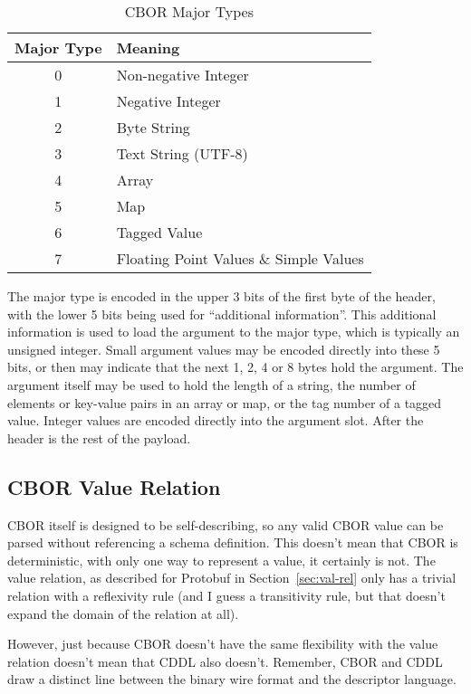 \documentclass[11pt]{article}
\theoremstyle{definition}
\theoremstyle{plain}
\begin{document}
\begin{table}[htbp]
  \centering
  \begin{tabular}{cl}
    \toprule
    Major Type & Meaning \\
    \midrule
    0 & Non-negative Integer \\
    1 & Negative Integer \\
    2 & Byte String \\
    3 & Text String (UTF-8) \\
    4 & Array \\
    5 & Map \\
    6 & Tagged Value \\
    7 & Floating Point Values \& Simple Values \\
    \bottomrule
  \end{tabular}
\caption{CBOR Major Types}
\label{tab:cbor-major-type}
\end{table}

The major type is encoded in the upper 3 bits of the first byte of the header,
with the lower 5 bits being used for ``additional information''. This additional
information is used to load the argument to the major type, which is typically
an unsigned integer. Small argument values may be encoded directly into these 5
bits, or then may indicate that the next 1, 2, 4 or 8 bytes hold the
argument. The argument itself may be used to hold the length of a string, the
number of elements or key-value pairs in an array or map, or the tag number of a
tagged value. Integer values are encoded directly into the argument slot. After
the header is the rest of the payload. 

\subsection{CBOR Value Relation}

CBOR itself is designed to be self-describing, so any valid CBOR value can be
parsed without referencing a schema definition. This doesn't mean that CBOR is
deterministic, with only one way to represent a value, it certainly is not. The
value relation, as described for Protobuf in Section~\ref{sec:val-rel} only has
a trivial relation with a reflexivity rule (and I guess a transitivity rule, but
that doesn't expand the domain of the relation at all).

However, just because CBOR doesn't have the same flexibility with the value
relation doesn't mean that CDDL also doesn't. Remember, CBOR and CDDL draw a
distinct line between the binary wire format and the descriptor language.
\end{document}
